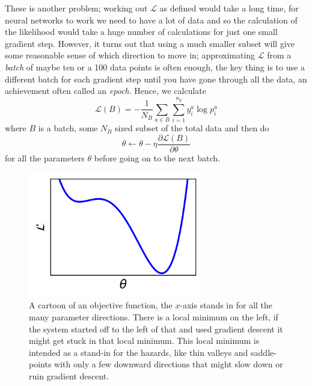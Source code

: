 \documentclass[12pt]{article}
\begin{document}
These is another problem; working out $\mathcal{L}$ as defined would
take a long time, for neural networks to work we need to have a lot of
data and so the calculation of the likelihood would take a huge number
of calculations for just one small gradient step. However, it turns
out that using a much smaller subset will give some reasonable sense
of which direction to move in; approximating $\mathcal{L}$ from a
\textsl{batch} of maybe ten or a 100 data points is often enough, the
key thing is to use a different batch for each gradient step until you
have gone through all the data, an achievement often called an
\textsl{epoch}. Hence, we calculate
\begin{equation}
  \mathcal{L}(B)=-\frac{1}{N_B}\sum_{a\in B} \sum_{i=1}^{n_y}y_i^a \log{p_i^a}
\end{equation}
where $B$ is a batch, some $N_B$ sized subset of the total data and then do
\begin{equation}
  \theta\leftarrow\theta-\eta\frac{\partial \mathcal{L}(B)}{\partial \theta}
\end{equation}
for all the parameters $\theta$ before going on to the next batch.


\begin{figure}[htb]
\begin{center}
  \includegraphics[width=3in]{03.3_objective.png}
\end{center}
\caption{A cartoon of an objective function, the $x$-axis stands in
  for all the many parameter directions. There is a local minimum on
  the left, if the system started off to the left of that and used
  gradient descent it might get stuck in that local minimum. This
  local minimum is intended as a stand-in for the hazards, like thin
  valleys and saddle-points with only a few downward directions that
  might slow down or ruin gradient descent.\label{fig:objective}}
\end{figure}
\end{document}

